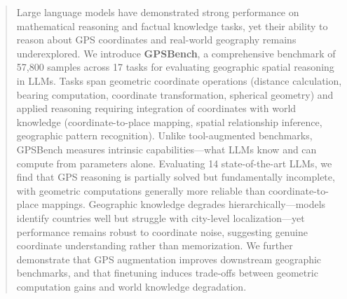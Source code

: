 \begin{abstract}
Large language models have demonstrated strong performance on mathematical reasoning and factual knowledge tasks, yet their ability to reason about GPS coordinates and real-world geography remains underexplored. We introduce \textbf{GPSBench}, a comprehensive benchmark of 57,800 samples across 17 tasks for evaluating geographic spatial reasoning in LLMs. Tasks span geometric coordinate operations (distance calculation, bearing computation, coordinate transformation, spherical geometry) and applied reasoning requiring integration of coordinates with world knowledge (coordinate-to-place mapping, spatial relationship inference, geographic pattern recognition). Unlike tool-augmented benchmarks, GPSBench measures intrinsic capabilities---what LLMs know and can compute from parameters alone. Evaluating 14 state-of-the-art LLMs, we find that GPS reasoning is partially solved but fundamentally incomplete, with geometric computations generally more reliable than coordinate-to-place mappings. Geographic knowledge degrades hierarchically---models identify countries well but struggle with city-level localization---yet performance remains robust to coordinate noise, suggesting genuine coordinate understanding rather than memorization. We further demonstrate that GPS augmentation improves downstream geographic benchmarks, and that finetuning induces trade-offs between geometric computation gains and world knowledge degradation.
\end{abstract}
